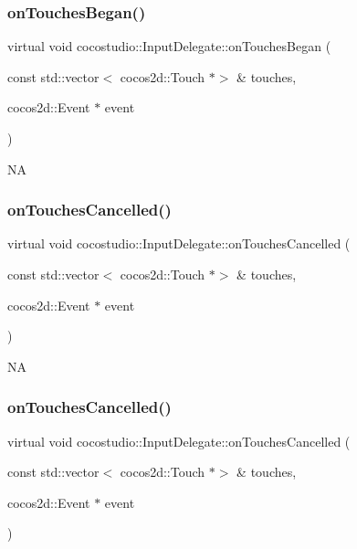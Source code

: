 \subsubsection{\texorpdfstring{on\+Touches\+Began()}{onTouchesBegan()}\hspace{0.1cm}{\footnotesize\ttfamily [2/2]}}
{\footnotesize\ttfamily virtual void cocostudio\+::\+Input\+Delegate\+::on\+Touches\+Began (\begin{DoxyParamCaption}\item[{const std\+::vector$<$ cocos2d\+::\+Touch $\ast$$>$ \&}]{touches,  }\item[{cocos2d\+::\+Event $\ast$}]{event }\end{DoxyParamCaption})\hspace{0.3cm}{\ttfamily [virtual]}}

NA \mbox{\label{classcocostudio_1_1InputDelegate_ac41eb0712f1d38b0ecb59426628f5ec3}} 
\subsubsection{\texorpdfstring{on\+Touches\+Cancelled()}{onTouchesCancelled()}\hspace{0.1cm}{\footnotesize\ttfamily [1/2]}}
{\footnotesize\ttfamily virtual void cocostudio\+::\+Input\+Delegate\+::on\+Touches\+Cancelled (\begin{DoxyParamCaption}\item[{const std\+::vector$<$ cocos2d\+::\+Touch $\ast$$>$ \&}]{touches,  }\item[{cocos2d\+::\+Event $\ast$}]{event }\end{DoxyParamCaption})\hspace{0.3cm}{\ttfamily [virtual]}}

NA \mbox{\label{classcocostudio_1_1InputDelegate_ac41eb0712f1d38b0ecb59426628f5ec3}} 
\subsubsection{\texorpdfstring{on\+Touches\+Cancelled()}{onTouchesCancelled()}\hspace{0.1cm}{\footnotesize\ttfamily [2/2]}}
{\footnotesize\ttfamily virtual void cocostudio\+::\+Input\+Delegate\+::on\+Touches\+Cancelled (\begin{DoxyParamCaption}\item[{const std\+::vector$<$ cocos2d\+::\+Touch $\ast$$>$ \&}]{touches,  }\item[{cocos2d\+::\+Event $\ast$}]{event }\end{DoxyParamCaption})\hspace{0.3cm}{\ttfamily [virtual]}}

